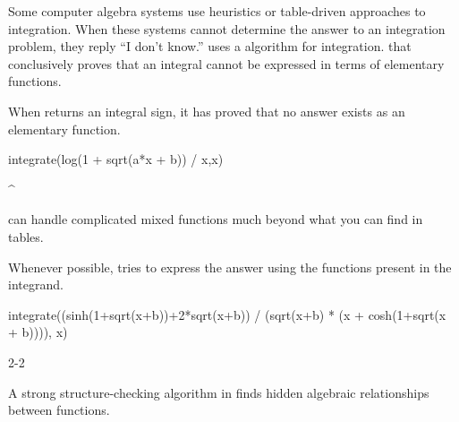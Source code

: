 {{{{{{{{Some computer algebra systems use heuristics or table-driven
approaches to integration.
When these systems cannot determine the answer to an integration
problem, they reply ``I don't know.'' \Language{} uses a
algorithm for integration.
that conclusively proves that an integral cannot be expressed in
terms of elementary functions.

\begin{xtc}
\begin{xtccomment}
When \Language{} returns an integral sign, it has proved
that no answer exists as an elementary function.
\end{xtccomment}
\begin{spadsrc}
integrate(log(1 + sqrt(a*x + b)) / x,x)
\end{spadsrc}
\begin{TeXOutput}
\begin{fricasmath}{6}
\int^{} \TIMES {}%
\end{fricasmath}
\end{TeXOutput}
\end{xtc}
\Language{} can handle complicated mixed functions much beyond what you
can find in tables.
\begin{xtc}
\begin{xtccomment}
Whenever possible, \Language{} tries to express the answer using the functions
present in the integrand.
\end{xtccomment}
\begin{spadsrc}
integrate((sinh(1+sqrt(x+b))+2*sqrt(x+b)) / (sqrt(x+b) * (x + cosh(1+sqrt(x + b)))), x)
\end{spadsrc}
\begin{TeXOutput}
\begin{fricasmath}{7}
2\TIMES {}-{2\TIMES {}}%
\end{fricasmath}
\end{TeXOutput}
\end{xtc}
\begin{xtc}
\begin{xtccomment}
A strong structure-checking algorithm in \Language{} finds hidden algebraic
relationships between functions.

\end{xtccomment}
\end{xtc}}}}}}}}}
